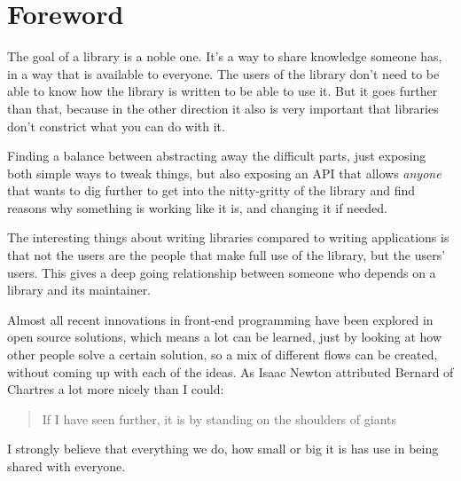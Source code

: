 
\chapter{Foreword}%
\label{chp:foreword}

The goal of a library is a noble one. It's a way to share knowledge someone has, in a way that is available to everyone. The users of the library don't need to be able to know how the library is written to be able to use it. But it goes further than that, because in the other direction it also is very important that libraries don't constrict what you can do with it.

Finding a balance between abstracting away the difficult parts, just exposing both simple ways to tweak things, but also exposing an API that allows \emph{anyone} that wants to dig further to get into the nitty-gritty of the library and find reasons why something is working like it is, and changing it if needed.

The interesting things about writing libraries compared to writing applications is that not the users are the people that make full use of the library, but the users' users. This gives a deep going relationship between someone who depends on a library and its maintainer.

Almost all recent innovations in front-end programming have been explored in open source solutions, which means a lot can be learned, just by looking at how other people solve a certain solution, so a mix of different flows can be created, without coming up with each of the ideas. As Isaac Newton attributed Bernard of Chartres a lot more nicely than I could: 

\begin{quotation}
  If I have seen further, it is by standing on the shoulders of giants
\end{quotation}

I strongly believe that everything we do, how small or big it is has use in being shared with everyone. 
